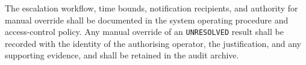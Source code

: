 \documentclass[11pt]{article}
\begin{document}
The escalation workflow, time bounds, notification recipients, and authority for manual override shall be documented in the system operating procedure and access-control policy. Any manual override of an \texttt{UNRESOLVED} result shall be recorded with the identity of the authorising operator, the justification, and any supporting evidence, and shall be retained in the audit archive.
\end{document}
